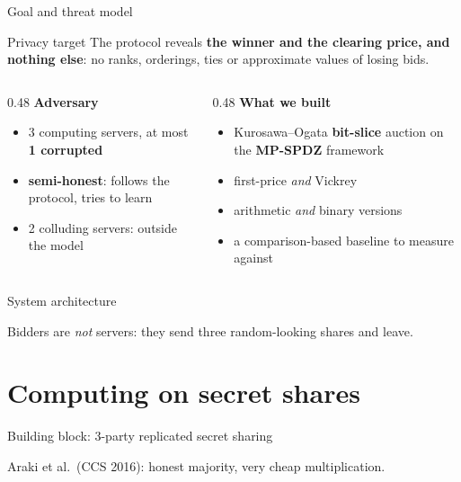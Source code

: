 \documentclass[aspectratio=169,11pt]{beamer}
\newcommand{\diagram}[2][\linewidth]{\resizebox{#1}{!}{}}
\newcommand{\diagramh}[2]{\resizebox{!}{#1}{}}
\begin{document}
\begin{frame}{Goal and threat model}
  \begin{block}{Privacy target}
    The protocol reveals \textbf{the winner and the clearing price, and nothing else}:
    no ranks, orderings, ties or approximate values of losing bids.
  \end{block}
  \begin{columns}[T]
    \begin{column}{0.48\textwidth}
      \textbf{Adversary}
      \begin{itemize}
        \item 3 computing servers, at most \textbf{1 corrupted}
        \item \textbf{semi-honest}: follows the protocol, tries to learn
        \item 2 colluding servers: outside the model
      \end{itemize}
    \end{column}
    \begin{column}{0.48\textwidth}
      \textbf{What we built}
      \begin{itemize}
        \item Kurosawa--Ogata \textbf{bit-slice} auction on the \textbf{MP-SPDZ} framework
        \item first-price \emph{and} Vickrey
        \item arithmetic \emph{and} binary versions
        \item a comparison-based baseline to measure against
      \end{itemize}
    \end{column}
  \end{columns}
\end{frame}

\begin{frame}{System architecture}
  \centering
  \diagramh{0.66\textheight}{architecture}
  \medskip

  \small Bidders are \emph{not} servers: they send three random-looking shares and leave.
\end{frame}

\section{Computing on secret shares}

\begin{frame}{Building block: 3-party replicated secret sharing}
  \centering
  \diagram[0.8\linewidth]{replicated}
  \medskip

  \small Araki et al.\ (CCS 2016): honest majority, very cheap multiplication.
\end{frame}
\end{document}
